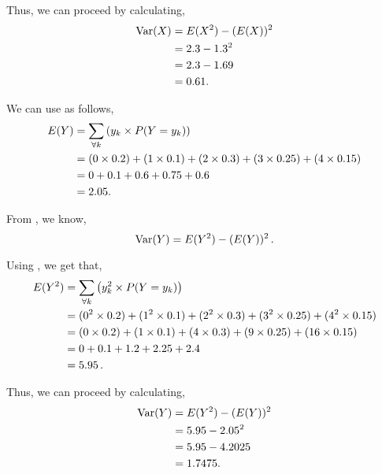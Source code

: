 \begin{subquestions}
\begin{subsubquestions}
\begin{subsubsubquestions}
Thus, we can proceed by calculating,
	\begin{align}
		\text{Var}(X) & = E(X^2) - (E(X))^2 \nonumber \\
		& = 2.3 - 1.3^2 \nonumber \\
		& = 2.3 - 1.69 \nonumber \\
		& = 0.61.
	\end{align}
		
\subsubsubquestion

We can use  as follows,
\begin{align}
	E(Y) & =  \sum_{\forall k} \left(y_k \times P(Y=y_k) \right) \nonumber \\
	& = (0 \times 0.2)+(1 \times 0.1)+(2 \times 0.3)+(3 \times 0.25)+(4 \times 0.15)\nonumber \\
	& = 0 + 0.1 + 0.6 + 0.75 + 0.6 \nonumber \\
	& = 2.05.
\end{align}

\subsubsubquestion

From , we know,
\begin{equation}
	\text{Var}(Y) = E(Y^2) - (E(Y))^2 \,.
\end{equation}

Using , we get that,
\begin{align}
	E(Y^2) & =  \sum_{\forall k} \left(y^2_k \times P(Y=y_k) \right) \nonumber \\
	       & = (0^2 \times 0.2) + (1^2 \times 0.1) + (2^2 \times 0.3) + (3^2 \times 0.25) + (4^2 \times 0.15) \nonumber \\
	       & = (0 \times 0.2) + (1 \times 0.1) + (4 \times 0.3) + (9 \times 0.25) + (16 \times 0.15) \nonumber \\
	       & = 0 + 0.1 + 1.2 + 2.25 + 2.4 \nonumber \\
	       & = 5.95 \,.
\end{align}

Thus, we can proceed by calculating,
\begin{align}
	\text{Var}(Y) & = E(Y^2) - (E(Y))^2 \nonumber \\
	& = 5.95 - 2.05^2 \nonumber \\
	& = 5.95 - 4.2025 \nonumber \\
	& = 1.7475.
\end{align}

\end{subsubsubquestions}



\end{subsubquestions}
\end{subquestions}
